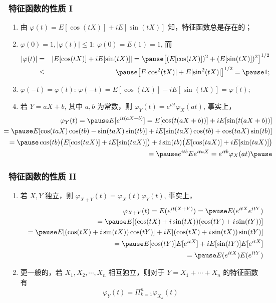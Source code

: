 \documentclass[Prob-All.tex]{subfiles}
\begin{document}
\begin{frame}%
	\frametitle{特征函数的性质 I}
	\begin{enumerate}[<+-|alert@+>]
		\item  由 $\varphi (t)=E[\cos (tX)]+iE[\sin (tX)]$ 知，特征函数总是存在的；
		\item $\varphi (0)=1, |\varphi (t)|\le 1$: $\varphi (0)=E (1)=1$, 而
		\begin{eqnarray*}
			|\varphi(t)|&=&|E[\cos(tX)]+iE[\sin(tX)]|=\pause \big[(E[\cos(tX)])^2+(E[\sin(tX)])^2\big]^{1/2}\\
			&\le&\pause \big[E[\cos^2(tX)]+E[\sin^2(tX)]\big]^{1/2}=\pause 1;
		\end{eqnarray*}
		\item $\varphi(-t)=\overline{\varphi(t)}$: $\varphi(-t)=E[\cos(tX)]-iE[\sin(tX)]=\overline{\varphi(t)}$;
		\item  若 $Y=aX+b$, 其中 $a,b$ 为常数，则 $\varphi_Y (t)=e^{ibt}\varphi_X (at)$, 事实上，
		{\small\begin{eqnarray*}
				&&\hspace{-1.2cm}\varphi_Y(t)=\pause E[e^{it(aX+b)}]=E[\cos(t(aX+b))]+iE[\sin(t(aX+b))]\\
				&&\hspace{-1.2cm}=\pause E[\cos(taX)\cos(tb)-\sin(taX)\sin(tb)]+iE[\sin(taX)\cos(tb)+\cos(taX)\sin(tb)]\\
				&&\hspace{-1.2cm}=\pause \cos(tb)\big(E[\cos(taX)]+iE[\sin(taX)]\big)+i\sin(tb)\big(E[\cos(taX)]+iE[\sin(taX)]\big)\\
				&&\hspace{-1.2cm}=\pause  e^{itb}Ee^{itaX}=e^{itb}\varphi_X(at)\pause
		\end{eqnarray*}}
	\end{enumerate}
\end{frame}
\begin{frame}
	\frametitle{特征函数的性质 II}

	\begin{enumerate}[<+-|alert@+>]
		\item[5.] 若 $X,Y$ 独立，则 $\varphi_{X+Y}(t)=\varphi_X (t)\varphi_Y (t)$, 事实上，
		\begin{eqnarray*}
			&&\varphi_{X+Y}(t)=E(e^{it(X+Y)})=\pause E(e^{itX}e^{itY})\\
			&&=\pause E[(\cos(tX)+i\sin(tX))(\cos(tY)+i\sin(tY))]\\
			&&=\pause E[(\cos(tX)+i\sin(tX))\cos(tY)]+iE[(\cos(tX)+i\sin(tX))\sin(tY)]\\
			&&=\pause E[\cos(tY)]E[e^{itX}]+iE[\sin(tY)]E[e^{itX}]\\
			&&=\pause E(e^{itX})E(e^{itY})
		\end{eqnarray*}\pause
		\item[6.] 更一般的，若 $X_1,X_2,\cdots,X_n$ 相互独立，则对于 $Y=X_1+\cdots+X_n$ 的特征函数有
		\begin{eqnarray*}
			\varphi_Y(t)=\Pi_{k=1}^n\varphi_{X_k}(t)
		\end{eqnarray*}
	\end{enumerate}
\end{frame}
\end{document}
